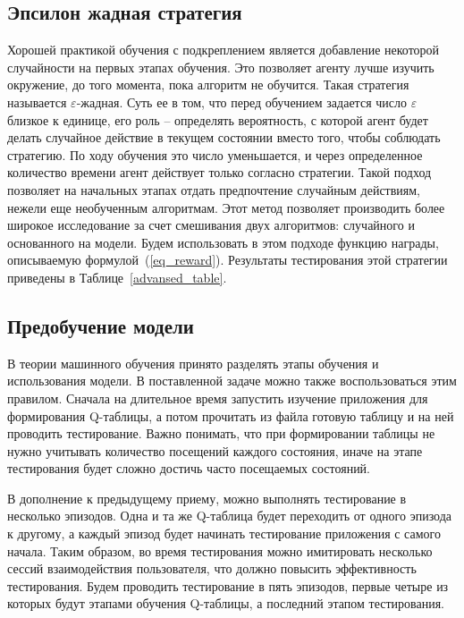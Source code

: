 \subsection{Эпсилон жадная стратегия}

Хорошей практикой обучения с подкреплением является добавление некоторой случайности на первых этапах обучения. Это позволяет агенту лучше изучить окружение, до того момента, пока алгоритм не обучится. Такая стратегия называется $\varepsilon$-жадная. Суть ее в том, что перед обучением задается число $\varepsilon$ близкое к единице, его роль -- определять вероятность, с которой агент будет делать случайное действие в текущем состоянии вместо того, чтобы соблюдать стратегию. По ходу обучения это число уменьшается, и через определенное количество времени агент действует только согласно стратегии. Такой подход позволяет на начальных этапах отдать предпочтение случайным действиям, нежели еще необученным алгоритмам. Этот метод позволяет производить более широкое исследование за счет смешивания двух алгоритмов: случайного и основанного на модели. Будем использовать в этом подходе функцию награды, описываемую формулой~(\ref{eq_reward}). Результаты тестирования этой стратегии приведены в Таблице~\ref{advansed_table}.


\subsection{Предобучение модели}\label{pretraining}

В теории машинного обучения принято разделять этапы обучения и использования модели. В поставленной задаче можно также воспользоваться этим правилом. Сначала на длительное время запустить изучение приложения для формирования Q-таблицы, а потом прочитать из файла готовую таблицу и на ней проводить тестирование. Важно понимать, что при формировании таблицы не нужно учитывать количество посещений каждого состояния, иначе на этапе тестирования будет сложно достичь часто посещаемых состояний.

В дополнение к предыдущему приему, можно выполнять тестирование в несколько эпизодов. Одна и та же Q-таблица будет переходить от одного эпизода к другому, а каждый эпизод будет начинать тестирование приложения с самого начала. Таким образом, во время тестирования можно имитировать несколько сессий взаимодействия пользователя, что должно повысить эффективность тестирования. Будем проводить тестирование в пять эпизодов, первые четыре из которых будут этапами обучения Q-таблицы, а последний этапом тестирования.


